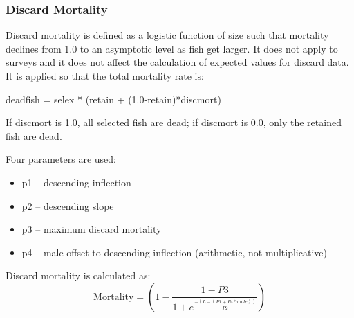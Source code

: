 \subsubsection{Discard Mortality}
Discard mortality is defined as a logistic function of size such that mortality declines from 1.0 to an asymptotic level as fish get larger.  It does not apply to surveys and it does not affect the calculation of expected values for discard data.   It is applied so that the total mortality rate is:\\
\begin{center}
	deadfish = selex * (retain + (1.0-retain)*discmort)
\end{center}
If discmort is 1.0, all selected fish are dead; if discmort is 0.0, only the retained fish are dead.

Four parameters are used:
\begin{itemize}
	\item p1 – descending inflection
	\item p2 – descending slope
	\item p3 – maximum discard mortality
	\item p4 – male offset to descending inflection (arithmetic, not multiplicative)
\end{itemize}

Discard mortality is calculated as:
\begin{equation}
	\text{Mortality} = \left(1 - \frac{1-P3}{1+e^{\frac{-(L-(P1+P4*male))}{P2}}}\right)
\end{equation}

